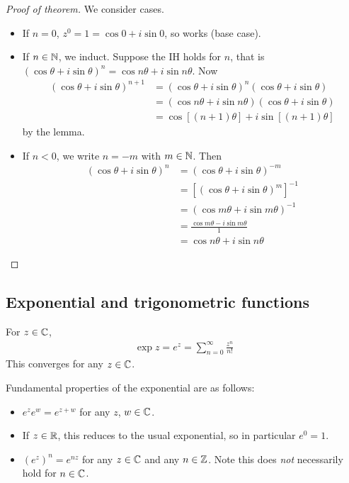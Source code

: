 \documentclass{../../template/note}
\begin{document}
    \begin{proof}[Proof of theorem] We consider cases.
        \begin{itemize}
            \item If \(n=0\), \(z^0 = 1 = \cos 0 + i \sin 0\), so works (base case).
            \item If \(n \in \mathbb N\), we induct.
            Suppose the IH holds for \(n\), that is \((\cos \theta + i \sin \theta)^n = \cos n\theta + i \sin n\theta\). Now
            \begin{align*}
                (\cos \theta + i \sin \theta)^{n+1} &= (\cos \theta + i \sin \theta)^n(\cos \theta + i \sin \theta) \\
                &= (\cos n\theta + i \sin n\theta)(\cos \theta + i \sin \theta) \\
                &= \cos [(n+1)\theta] + i \sin [(n+1)\theta]
            \end{align*}
            by the lemma.
            \item If \(n < 0\), we write \(n = -m\) with \(m \in \mathbb N\). Then
            \begin{align*}
                (\cos \theta + i \sin \theta)^n &= (\cos \theta + i \sin \theta)^{-m} \\
                &= [(\cos \theta + i \sin \theta)^m]^{-1} \\
                &= (\cos m\theta + i \sin m\theta)^{-1} \\
                &= \frac{\cos m\theta - i \sin m\theta}{1} \\
                &= \cos n \theta + i \sin n \theta
            \end{align*}
        \end{itemize}
    \end{proof}
    
    \subsection{Exponential and trigonometric functions}
    
    \begin{definition}
        For \(z \in \mathbb C\),
        \begin{align*}
            \exp z = e^z = \sum_{n=0}^\infty \frac{z^n}{n!}
        \end{align*}
        This converges for any \(z \in \mathbb C\).        
    \end{definition}
    
    Fundamental properties of the exponential are as follows:
    \begin{itemize}
        \item \(e^ze^w=e^{z+w}\) for any \(z\), \(w \in \mathbb C\).
        \item If \(z \in \mathbb R\), this reduces to the usual exponential, so in particular \(e^0=1\).
        \item \((e^z)^n = e^{nz}\) for any \(z \in \mathbb C\) and any \(n \in \mathbb Z\). Note this does \emph{not} necessarily hold for \(n \in \mathbb C\). 
    \end{itemize}
    
\end{document}
